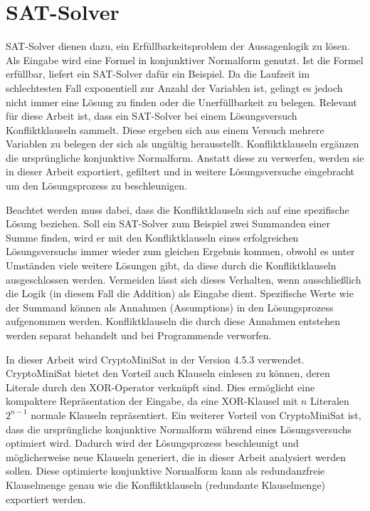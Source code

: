 \section{SAT-Solver}
\label{sec:satsolver}

SAT-Solver dienen dazu, ein Erfüllbarkeitsproblem der Aussagenlogik zu lösen. Als Eingabe wird eine Formel in konjunktiver Normalform genutzt.
Ist die Formel erfüllbar, liefert ein SAT-Solver dafür ein Beispiel. Da die Laufzeit im schlechtesten Fall exponentiell zur Anzahl der Variablen
ist, gelingt es jedoch nicht immer eine Lösung zu finden oder die Unerfüllbarkeit zu belegen. Relevant für diese Arbeit ist, dass ein SAT-Solver
bei einem Lösungsversuch Konfliktklauseln sammelt. Diese ergeben sich aus einem Versuch mehrere Variablen zu belegen der sich als ungültig herausstellt.
Konfliktklauseln ergänzen die ursprüngliche konjunktive Normalform. Anstatt diese zu verwerfen, werden sie in dieser Arbeit exportiert, gefiltert
und in weitere Lösungsversuche eingebracht um den Lösungsprozess zu beschleunigen.

Beachtet werden muss dabei, dass die Konfliktklauseln sich auf eine spezifische Lösung beziehen. Soll ein SAT-Solver zum Beispiel zwei Summanden
einer Summe finden, wird er mit den Konfliktklauseln eines erfolgreichen Lösungsversuchs immer wieder zum gleichen Ergebnis kommen, obwohl es
unter Umständen viele weitere Lösungen gibt, da diese durch die Konfliktklauseln ausgeschlossen werden. Vermeiden lässt sich dieses Verhalten,
wenn ausschließlich die Logik (in diesem Fall die Addition) als Eingabe dient. Spezifische Werte wie der Summand können als Annahmen (Assumptions)
in den Lösungsprozess aufgenommen werden. Konfliktklauseln die durch diese Annahmen entstehen werden separat behandelt und bei Programmende verworfen.

In dieser Arbeit wird CryptoMiniSat in der Version 4.5.3 verwendet. CryptoMiniSat bietet den Vorteil auch Klauseln einlesen zu können, deren Literale
durch den XOR-Operator verknüpft sind. Dies ermöglicht eine kompaktere Repräsentation der Eingabe, da eine XOR-Klausel mit $n$ Literalen $2^{n-1}$
normale Klauseln repräsentiert. Ein weiterer Vorteil von CryptoMiniSat ist, dass die ursprüngliche konjunktive Normalform während eines Lösungsversuchs
optimiert wird. Dadurch wird der Lösungsprozess beschleunigt und möglicherweise neue Klauseln generiert, die in dieser Arbeit analysiert werden sollen. 
Diese optimierte konjunktive Normalform kann als redundanzfreie Klauselmenge genau wie die Konfliktklauseln (redundante Klauselmenge) exportiert werden.